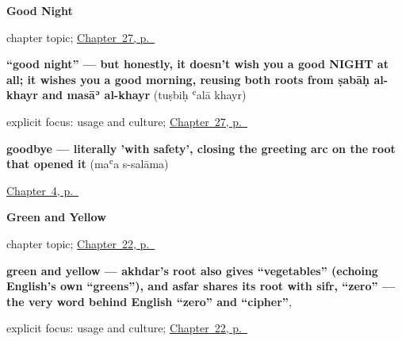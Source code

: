 \noindent\begin{minipage}[t]{\linewidth}
\raggedright
\textbf{Good Night}\par
\footnotesize chapter topic; \hyperref[ch:ar-good-night]{Chapter~27, p.~\pageref*{ch:ar-good-night}}
\end{minipage}\par\smallskip

\noindent\begin{minipage}[t]{\linewidth}
\raggedright
\textbf{\textquotedblleft{}good night\textquotedblright{} — but honestly, it doesn't wish you a good NIGHT at all; it wishes you a good morning, reusing both roots from ṣabāḥ al-khayr and masāʾ al-khayr}\enspace\emph{  }\enspace(tuṣbiḥ ʿalā khayr)\par
\footnotesize explicit focus: usage and culture; \hyperref[ch:ar-good-night]{Chapter~27, p.~\pageref*{ch:ar-good-night}}
\end{minipage}\par\smallskip

\noindent\begin{minipage}[t]{\linewidth}
\raggedright
\textbf{goodbye — literally 'with safety', closing the greeting arc on the root that opened it}\enspace\emph{ }\enspace(maʿa s-salāma)\par
\footnotesize \hyperref[ch:ar-farewells]{Chapter~4, p.~\pageref*{ch:ar-farewells}}
\end{minipage}\par\smallskip

\noindent\begin{minipage}[t]{\linewidth}
\raggedright
\textbf{Green and Yellow}\par
\footnotesize chapter topic; \hyperref[ch:ar-green-and-yellow]{Chapter~22, p.~\pageref*{ch:ar-green-and-yellow}}
\end{minipage}\par\smallskip

\noindent\begin{minipage}[t]{\linewidth}
\raggedright
\textbf{green and yellow — akhdar's root also gives \textquotedblleft{}vegetables\textquotedblright{} (echoing English's own \textquotedblleft{}greens\textquotedblright{}), and asfar shares its root with sifr, \textquotedblleft{}zero\textquotedblright{} — the very word behind English \textquotedblleft{}zero\textquotedblright{} and \textquotedblleft{}cipher\textquotedblright{}}\enspace\emph{, }\par
\footnotesize explicit focus: usage and culture; \hyperref[ch:ar-green-and-yellow]{Chapter~22, p.~\pageref*{ch:ar-green-and-yellow}}
\end{minipage}\par\smallskip

